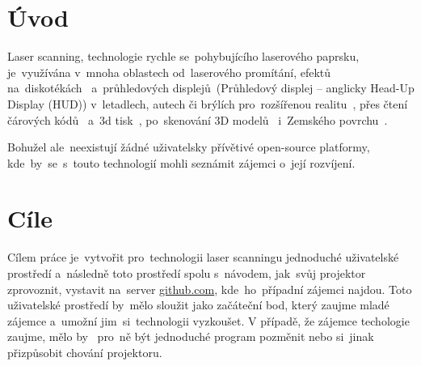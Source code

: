 \chapter*{Úvod}


Laser scanning, technologie rychle se~pohybujícího laserového paprsku, je~využívána v~mnoha oblastech od~laserového promítání, efektů na~diskotékách~\cite{laser-projection} a~průhledových displejů~(Průhledový displej -- anglicky Head-Up Display (HUD)) v~letadlech, autech či brýlích pro~rozšířenou realitu~\cite{laser-huds}, přes čtení čárových kódů~\cite{history-of-barcode-scanning} a~3d tisk~\cite{Photo-curing-3D-printing}, po~skenování 3D modelů~\cite{3d-model-scan} i~Zemského povrchu~\cite{heightmaps}.

Bohužel ale~neexistují žádné uživatelsky přívětivé open-source platformy, kde~by~se~s~touto technologií mohli seznámit zájemci o~její rozvíjení.

\chapter{Cíle}
Cílem práce je~vytvořit pro~technologii laser scanningu jednoduché uživatelské prostředí a~následně toto prostředí spolu s~návodem, jak~svůj projektor zprovoznit, vystavit na~server \url{github.com}, kde~ho~případní zájemci najdou.
Toto uživatelské prostředí by~mělo sloužit jako začáteční bod, který zaujme mladé zájemce a~umožní jim~si~technologii vyzkoušet.
V případě, že zájemce techologie zaujme, mělo by ~pro~ně být jednoduché program pozměnit nebo si~jinak přizpůsobit chování projektoru.
